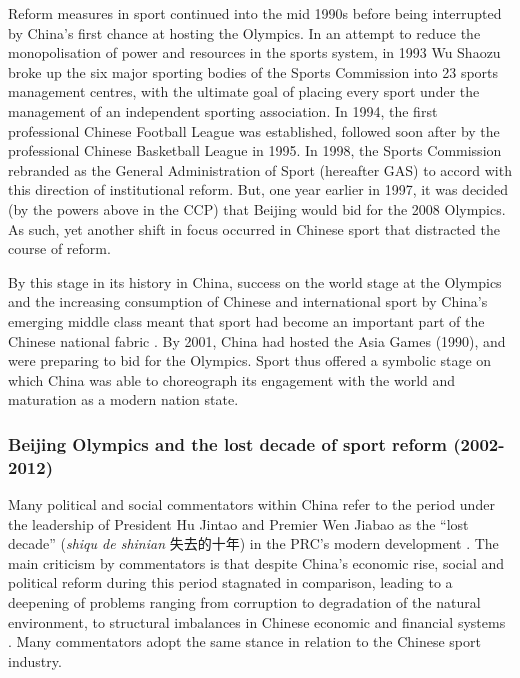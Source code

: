\begin{CJK}{UTF8}{gbsn}

Reform measures in sport continued into the mid 1990s before being interrupted by China's first chance at hosting the Olympics.  In an attempt to reduce the monopolisation of power and resources in the sports system, in 1993 Wu Shaozu broke up the six major sporting bodies of the Sports Commission into 23 sports management centres, with the ultimate goal of placing every sport under the management of an independent sporting association.  In 1994, the first professional Chinese Football League was established, followed soon after by the professional Chinese Basketball League in 1995.  In 1998, the Sports Commission rebranded as the General Administration of Sport (hereafter GAS) to accord with this direction of institutional reform.  But, one year earlier in 1997, it was decided (by the powers above in the CCP) that Beijing would bid for the 2008 Olympics. As such, yet another shift in focus occurred in Chinese sport that distracted the course of reform.

By this stage in its history in China, success on the world stage at the Olympics and the increasing consumption of Chinese and international sport by China's emerging middle class meant that sport had become an important part of the Chinese national fabric \citep{Brownell}. By 2001, China had hosted the Asia Games (1990), and were preparing to bid for the Olympics.  Sport thus offered a symbolic stage on which China was able to choreograph its engagement with the world and maturation as a modern nation state.

\subsubsection{Beijing Olympics and the lost decade of sport reform (2002-2012)}

Many political and social commentators within China refer to the period under the leadership of President Hu Jintao and Premier Wen Jiabao as the ``lost decade'' (\textit{shiqu de shinian} 失去的十年) in the PRC's modern development \citep{Johnson2012}.  The main criticism by commentators is that despite China's economic rise, social and political reform during this period stagnated in comparison, leading to a deepening of problems ranging from corruption to degradation of the natural environment, to structural imbalances in Chinese economic and financial systems \citep{Barme2014,Minzner2018}.  Many commentators adopt the same stance in relation to the Chinese sport industry.


\end{CJK}
